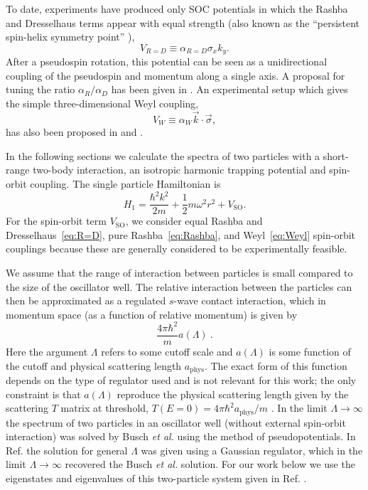 To date, experiments have produced only SOC potentials in which the Rashba and Dresselhaus terms appear with equal strength (also known as the ``persistent spin-helix symmetry point'' \cite{PhysRevLett.97.236601}), 
\begin{equation}
\label{eq:R=D}
V_{R=D}\equiv\alpha_{R=D}\sigma_x k_y.
\end{equation} 
After a pseudospin rotation, this potential can be seen as a unidirectional coupling of the pseudospin and momentum along a single axis. A proposal for tuning the ratio $\alpha_R/\alpha_D$ has been given in \cite{PhysRevA.84.025602}.  An experimental setup which gives the simple three-dimensional Weyl coupling,
\begin{equation}\label{eq:Weyl}
V_{W}\equiv\alpha_W \vec{k}\cdot\vec{\sigma},
\end{equation}
has also been proposed in \cite{PhysRevLett.108.235301} and \cite{PhysRevLett.111.125301}. 

In the following sections we calculate the spectra of two particles with a short-range two-body interaction, an isotropic harmonic trapping potential and spin-orbit coupling. The single particle Hamiltonian is 
\begin{equation}\label{eq:shortRangeInteraction}
H_1=\frac{\hbar^2 k^2}{2m}+\frac{1}{2}m\omega^2 r^2 + V_{\text{SO}}.
\end{equation}
For the spin-orbit term $V_{\text{SO}}$, we consider equal Rashba and Dresselhaus~\eqref{eq:R=D}, pure Rashba~\eqref{eq:Rashba}, and Weyl~\eqref{eq:Weyl} spin-orbit couplings  because these are generally considered to be experimentally feasible.

We assume that the range of interaction between particles is small compared to the size of the oscillator well.  The relative interaction between the particles can then be approximated as a regulated $s$-wave contact interaction, which in momentum space (as a function of relative momentum) is given by
\begin{equation}
\frac{4\pi \hbar^2}{m}a(\Lambda)\ .
\end{equation}
Here the argument $\Lambda$ refers to some cutoff scale and $a(\Lambda)$ is some function of the cutoff and physical scattering length $a_{\text{phys}}$.  The exact form of this function depends on the type of regulator used and is not relevant for this work; the only constraint is that $a(\Lambda)$ reproduce the physical scattering length given by the scattering $T$ matrix at threshold, $T(E=0)=4\pi\hbar^2 a_{\text{phys}}/m$ \cite{taylor2000}. In the limit $\Lambda\rightarrow \infty$ the spectrum of two particles in an oscillator well (without external spin-orbit interaction) was solved by Busch \textit{et al.} \cite{Busch} using the method of pseudopotentials.  In Ref.  \cite{Luu:2006xv} the solution for general $\Lambda$ was given using a Gaussian regulator, which in the limit $\Lambda\rightarrow\infty$ recovered the Busch \textit{et al.} solution.  For our work below we use the eigenstates and eigenvalues of this two-particle system given in Ref. \cite{Busch}.

